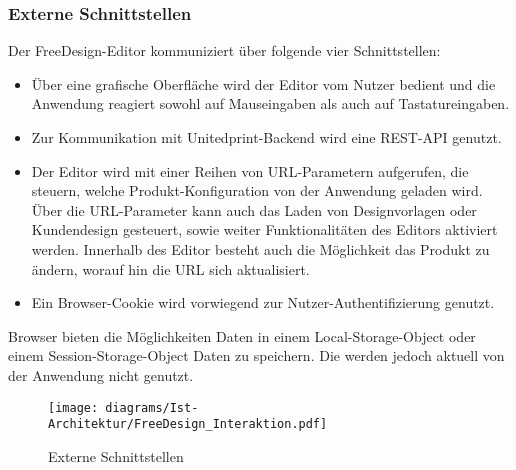 \subsubsection{Externe Schnittstellen}
Der FreeDesign-Editor kommuniziert über folgende vier Schnittstellen:
\begin{itemize}
	\item Über eine grafische Oberfläche wird der Editor vom Nutzer bedient und die Anwendung reagiert sowohl auf Mauseingaben als auch auf Tastatureingaben. 
	\item Zur Kommunikation mit Unitedprint-Backend wird eine REST-API genutzt. 
	\item Der Editor wird mit einer Reihen von URL-Parametern aufgerufen, die steuern, welche Produkt-Konfiguration von der Anwendung geladen wird. Über die URL-Parameter kann auch das Laden von Designvorlagen oder Kundendesign gesteuert, sowie weiter Funktionalitäten des Editors aktiviert werden. 
	Innerhalb des Editor besteht auch die Möglichkeit das Produkt zu ändern, worauf hin die URL sich aktualisiert.
	\item Ein Browser-Cookie wird vorwiegend zur Nutzer-Authentifizierung genutzt. 
\end{itemize}

Browser bieten die Möglichkeiten Daten in einem Local-Storage-Object oder einem Session-Storage-Object Daten zu speichern. \autocite[vgl.][]{Mozilla:Storage}
Die werden jedoch aktuell von der Anwendung nicht genutzt. 


\begin{figure}[H]
    \centering
    \texttt{[image: diagrams/Ist-Architektur/FreeDesign\_Interaktion.pdf]}
     \caption{Externe Schnittstellen}
     \label{fig:Externe_Schnittstellen}
  \end{figure}
  